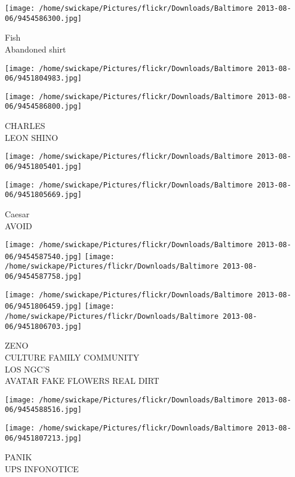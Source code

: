 \documentclass[10pt,letterpaper]{article}
\begin{document}
\vspace{0.25in}
\texttt{[image: /home/swickape/Pictures/flickr/Downloads/Baltimore 2013-08-06/9454586300.jpg]}

Fish\\
Abandoned shirt\\
\pagebreak

\texttt{[image: /home/swickape/Pictures/flickr/Downloads/Baltimore 2013-08-06/9451804983.jpg]}

\vspace{0.25in}
\texttt{[image: /home/swickape/Pictures/flickr/Downloads/Baltimore 2013-08-06/9454586800.jpg]}

CHARLES\\
LEON SHINO\\
\pagebreak

\texttt{[image: /home/swickape/Pictures/flickr/Downloads/Baltimore 2013-08-06/9451805401.jpg]}

\vspace{0.25in}
\texttt{[image: /home/swickape/Pictures/flickr/Downloads/Baltimore 2013-08-06/9451805669.jpg]}

Caesar\\
AVOID\\
\pagebreak

\texttt{[image: /home/swickape/Pictures/flickr/Downloads/Baltimore 2013-08-06/9454587540.jpg]}
\texttt{[image: /home/swickape/Pictures/flickr/Downloads/Baltimore 2013-08-06/9454587758.jpg]}

\texttt{[image: /home/swickape/Pictures/flickr/Downloads/Baltimore 2013-08-06/9451806459.jpg]}
\texttt{[image: /home/swickape/Pictures/flickr/Downloads/Baltimore 2013-08-06/9451806703.jpg]}

ZENO\\
CULTURE FAMILY COMMUNITY\\
LOS NGC'S\\
AVATAR FAKE FLOWERS REAL DIRT\\
\pagebreak

\texttt{[image: /home/swickape/Pictures/flickr/Downloads/Baltimore 2013-08-06/9454588516.jpg]}

\vspace{0.25in}
\texttt{[image: /home/swickape/Pictures/flickr/Downloads/Baltimore 2013-08-06/9451807213.jpg]}

PANIK\\
UPS INFONOTICE\\
\pagebreak
\end{document}
